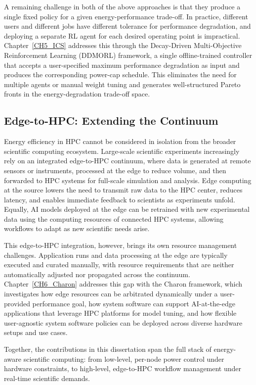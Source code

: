 A remaining challenge in both of the above approaches is that they produce a single
fixed policy for a given energy-performance trade-off.
In practice, different users and different jobs have different tolerance for performance
degradation, and deploying a separate RL agent for each desired operating point is
impractical.
Chapter~\ref{CH5_ICS} addresses this through the Decay-Driven Multi-Objective
Reinforcement Learning (DDMORL) framework, a single offline-trained controller that
accepts a user-specified maximum performance degradation as input and produces
the corresponding power-cap schedule.
This eliminates the need for multiple agents or manual weight tuning and generates
well-structured Pareto fronts in the energy-degradation trade-off space.

\subsection*{Edge-to-HPC: Extending the Continuum}

Energy efficiency in HPC cannot be considered in isolation from the broader scientific
computing ecosystem.
Large-scale scientific experiments increasingly rely on an integrated edge-to-HPC
continuum, where data is generated at remote sensors or instruments, processed at the
edge to reduce volume, and then forwarded to HPC systems for full-scale simulation
and analysis.
Edge computing at the source lowers the need to transmit raw data to the HPC center,
reduces latency, and enables immediate feedback to scientists as experiments unfold.
Equally, AI models deployed at the edge can be retrained with new experimental data
using the computing resources of connected HPC systems, allowing workflows to adapt as
new scientific needs arise.

This edge-to-HPC integration, however, brings its own resource management challenges.
Application runs and data processing at the edge are typically executed and curated
manually, with resource requirements that are neither automatically adjusted nor
propagated across the continuum.
Chapter~\ref{CH6_Charon} addresses this gap with the Charon framework, which
investigates how edge resources can be arbitrated dynamically under a user-provided
performance goal, how system software can support AI-at-the-edge applications that
leverage HPC platforms for model tuning, and how flexible user-agnostic system software
policies can be deployed across diverse hardware setups and use cases.

Together, the contributions in this dissertation span the full stack of energy-aware
scientific computing: from low-level, per-node power control under hardware constraints,
to high-level, edge-to-HPC workflow management under real-time scientific demands.


